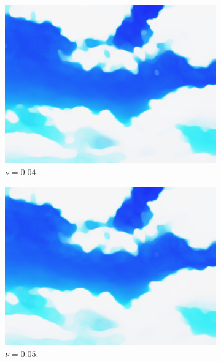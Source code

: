 \documentclass[abstracton]{scrreprt}
\begin{document}
\begin{figure}[!ht]
\begin{subfigure}[b]{0.16\textwidth}
                    \includegraphics[width=\textwidth]{img/segmentation/cr/004blue.png}
                    \caption{$\nu = 0.04$.}
                \end{subfigure}
                \begin{subfigure}[b]{0.16\textwidth}
                    \includegraphics[width=\textwidth]{img/segmentation/cr/005blue.png}
                    \caption{$\nu = 0.05$.}
                \end{subfigure}
                \begin{subfigure}[b]{0.16\textwidth}

\end{subfigure}
\end{figure}
\end{document}
